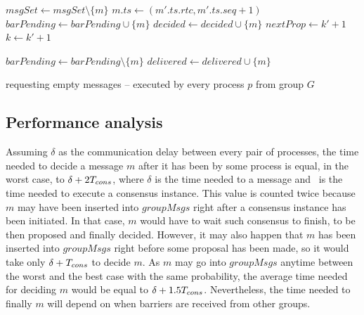 \documentclass[times, 10pt]{article}
\begin{document}
\begin{algorithm}
\begin{distribalgo}[1]
\blankline
{}
    \STATE $msgSet \leftarrow msgSet \setminus \{m\}$
      \STATE $m.ts \leftarrow (m'.ts.rtc, m'.ts.seq + 1)$ \label{algline:chgts}
    \ENDIF     
     \label{algline:checkcons}
      \STATE $barPending \leftarrow barPending \cup \{m\}$
    \ENDIF
    \STATE $decided \leftarrow decided \cup \{m\}$
      \STATE {} \label{algline:barreq} 
    \ELSE
      \STATE {} 
    \ENDIF
  \ENDINDENT
  \STATE $nextProp \leftarrow k' + 1$
  \STATE $k \leftarrow k' + 1$
\ENDINDENT

\blankline
{}
  \STATE $barPending \leftarrow barPending \setminus \{m\}$
    \STATE {}
  \ENDIF
  \STATE $delivered \leftarrow delivered \cup \{m\}$

\blankline
\ENDINDENT

\caption{ requesting empty messages -- executed by every process $p$ from group $G$}
\label{algorithm:nullondemand}
\end{distribalgo}
\end{algorithm}
 
 \subsection{Performance analysis}
 
 Assuming $\delta$ as the communication delay between every pair of processes, the time needed to decide a message $m$ after it has been \amcast{} by some process is equal, in the worst case, to $\delta + 2T_{cons}$, where $\delta$ is the time needed to \rmdel{} a message and \tcons\ is the time needed to execute a consensus instance. This value is counted twice because $m$ may have been inserted into $groupMsgs$ right after a consensus instance has been initiated. In that case, $m$ would have to wait such consensus to finish, to be then proposed and finally decided. However, it may also happen that $m$ has been inserted into $groupMsgs$ right before some proposal has been made, so it would take only $\delta + T_{cons}$ to decide $m$. As $m$ may go into $groupMsgs$ anytime between the worst and the best case with the same probability, the average time needed for deciding $m$ would be equal to $\delta + 1.5T_{cons}$. Nevertheless, the time needed to finally \cons{} $m$ will depend on when barriers are received from other groups.
\end{document}
